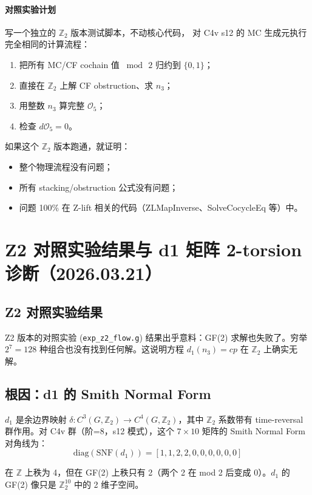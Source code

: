 \documentclass[a4paper,fontset=ubuntu,12pt]{ctexart}
\begin{document}
\paragraph{对照实验计划}
写一个独立的 $\mathbb{Z}_2$ 版本测试脚本，不动核心代码，
对 C4v s12 的 MC 生成元执行完全相同的计算流程：
\begin{enumerate}
\item 把所有 MC/CF cochain 值 $\bmod\,2$ 归约到 $\{0, 1\}$；
\item 直接在 $\mathbb{Z}_2$ 上解 CF obstruction、求 $n_3$；
\item 用整数 $n_3$ 算完整 $\mathcal{O}_5$；
\item 检查 $d\mathcal{O}_5 = 0$。
\end{enumerate}
如果这个 $\mathbb{Z}_2$ 版本跑通，就证明：
\begin{itemize}
\item 整个物理流程没有问题；
\item 所有 stacking/obstruction 公式没有问题；
\item 问题 100\% 在 Z-lift 相关的代码（ZLMapInverse、SolveCocycleEq 等）中。
\end{itemize}


\section{Z2 对照实验结果与 d1 矩阵 2-torsion 诊断（2026.03.21）}

\subsection{Z2 对照实验结果}

Z2 版本的对照实验 (\texttt{exp\_z2\_flow.g}) 结果出乎意料：GF(2) 求解也失败了。穷举 $2^7 = 128$ 种组合也没有找到任何解。这说明方程 $d_1(n_3) = cp$ 在 $\mathbb{Z}_2$ 上确实无解。

\subsection{根因：d1 的 Smith Normal Form}

$d_1$ 是余边界映射 $\delta: C^3(G, \mathbb{Z}_2) \to C^4(G, \mathbb{Z}_2)$，其中 $\mathbb{Z}_2$ 系数带有 time-reversal 群作用。对 C4v 群（阶=8，s12 模式），这个 $7 \times 10$ 矩阵的 Smith Normal Form 对角线为：
$$\mathrm{diag}(\mathrm{SNF}(d_1)) = [1, 1, 2, 2, 0, 0, 0, 0, 0, 0]$$

在 $\mathbb{Z}$ 上秩为 4，但在 GF(2) 上秩只有 2（两个 2 在 mod 2 后变成 0）。$d_1$ 的 GF(2) 像只是 $\mathbb{Z}_2^{10}$ 中的 2 维子空间。
\end{document}
